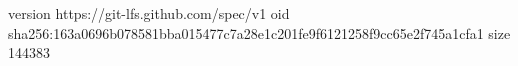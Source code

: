 version https://git-lfs.github.com/spec/v1
oid sha256:163a0696b078581bba015477c7a28e1c201fe9f6121258f9cc65e2f745a1cfa1
size 144383
